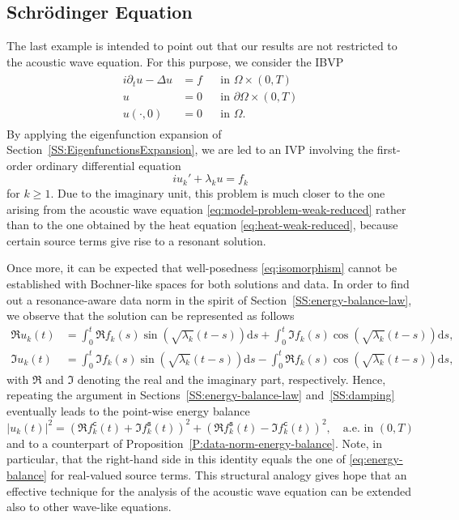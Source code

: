 \documentclass{amsart}
\theoremstyle{plain}
\theoremstyle{remark}
\numberwithin{equation}{section}
\numberwithin{theorem}{section}
\newcommand{\fsin}{f_{k}^{\mathtt{s}}}
\newcommand{\fcos}{f_{k}^{\mathtt{c}}}
\begin{document}
\subsection{Schrödinger Equation} 
%
The last example is intended to point out that our results are not restricted to the acoustic wave equation. For this purpose, we consider the IBVP
\begin{equation*}
	\begin{aligned}
		\begin{aligned}
			i\partial_t u - \Delta u & = f && \text{in } \Omega \times (0,T) \\
			u & = 0 && \text{in } \partial\Omega \times (0,T) \\
			u(\cdot, 0) & = 0 && \text{in } \Omega. 
		\end{aligned}
	\end{aligned}
\end{equation*}
By applying the eigenfunction expansion of Section~\ref{SS:EigenfunctionsExpansion}, we are led to an IVP involving the first-order ordinary differential equation
\[
	i u_k' + \lambda_k u = f_k
\]
for $k \geq 1$. Due to the imaginary unit, this problem is much closer to the one arising from the acoustic wave equation \eqref{eq:model-problem-weak-reduced} rather than to the one obtained by the heat equation \eqref{eq:heat-weak-reduced}, because certain source terms give rise to a resonant solution.

Once more, it can be expected that well-posedness \eqref{eq:isomorphism} cannot be established with Bochner-like spaces for both solutions and data. In order to find out a resonance-aware data norm in the spirit of Section~\ref{SS:energy-balance-law}, we observe that the solution can be represented as follows
\begin{align*}
	\Re u_k(t) &= \int_0^t \Re f_k(s)\sin(\sqrt{\lambda_k}(t-s))\mathrm ds + \int_0^t \Im f_k(s)\cos(\sqrt{\lambda_k}(t-s))\mathrm ds, \\
	\Im u_k(t) &= \int_0^t \Im f_k(s)\sin(\sqrt{\lambda_k}(t-s))\mathrm ds - \int_0^t \Re f_k(s)\cos(\sqrt{\lambda_k}(t-s))\mathrm ds,
\end{align*}
with $\Re$ and $\Im$ denoting the real and the imaginary part, respectively. Hence, repeating the argument in Sections~\ref{SS:energy-balance-law} and~\ref{SS:damping} eventually leads to the point-wise energy balance
\[
|u_k(t)|^2 = \left(\Re \fcos(t) + \Im \fsin(t)\right)^2 + \left(\Re \fsin(t) - \Im \fcos(t)\right)^2, \quad \text{a.e. in $(0,T)$}
\]
and to a counterpart of Proposition~\ref{P:data-norm-energy-balance}. Note, in particular, that the right-hand side in this identity equals the one of \eqref{eq:energy-balance} for real-valued source terms. This structural analogy gives hope that an effective technique for the analysis of the acoustic wave equation can be extended also to other wave-like equations.



\end{document}
